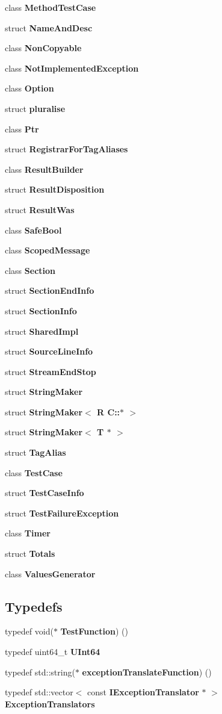 \begin{DoxyCompactItemize}
\item 
class \textbf{ Method\+Test\+Case}
\item 
struct \textbf{ Name\+And\+Desc}
\item 
class \textbf{ Non\+Copyable}
\item 
class \textbf{ Not\+Implemented\+Exception}
\item 
class \textbf{ Option}
\item 
struct \textbf{ pluralise}
\item 
class \textbf{ Ptr}
\item 
struct \textbf{ Registrar\+For\+Tag\+Aliases}
\item 
class \textbf{ Result\+Builder}
\item 
struct \textbf{ Result\+Disposition}
\item 
struct \textbf{ Result\+Was}
\item 
class \textbf{ Safe\+Bool}
\item 
class \textbf{ Scoped\+Message}
\item 
class \textbf{ Section}
\item 
struct \textbf{ Section\+End\+Info}
\item 
struct \textbf{ Section\+Info}
\item 
struct \textbf{ Shared\+Impl}
\item 
struct \textbf{ Source\+Line\+Info}
\item 
struct \textbf{ Stream\+End\+Stop}
\item 
struct \textbf{ String\+Maker}
\item 
struct \textbf{ String\+Maker$<$ R C\+::$\ast$ $>$}
\item 
struct \textbf{ String\+Maker$<$ T $\ast$ $>$}
\item 
struct \textbf{ Tag\+Alias}
\item 
class \textbf{ Test\+Case}
\item 
struct \textbf{ Test\+Case\+Info}
\item 
struct \textbf{ Test\+Failure\+Exception}
\item 
class \textbf{ Timer}
\item 
struct \textbf{ Totals}
\item 
class \textbf{ Values\+Generator}
\end{DoxyCompactItemize}
\subsection*{Typedefs}
\begin{DoxyCompactItemize}
\item 
typedef void($\ast$ \textbf{ Test\+Function}) ()
\item 
typedef uint64\+\_\+t \textbf{ U\+Int64}
\item 
typedef std\+::string($\ast$ \textbf{ exception\+Translate\+Function}) ()
\item 
typedef std\+::vector$<$ const \textbf{ I\+Exception\+Translator} $\ast$ $>$ \textbf{ Exception\+Translators}
\end{DoxyCompactItemize}
